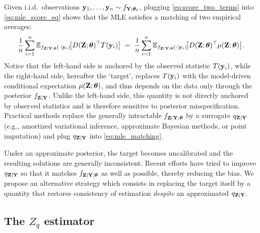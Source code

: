 \documentclass[twoside,11pt]{article}
\begin{document}
Given i.i.d.\ observations ${\bf y}_1,\dots,{\bf y}_n \sim f_{{\bf Y};{\bm{\theta}}_0}$, plugging \eqref{eq:score_two_terms}
into \eqref{eq:mle_score_eq} shows that the MLE satisfies a matching of two empirical averages:
\begin{equation}
\frac{1}{n}\sum_{i=1}^n
\mathbb{E}_{f_{{\bf Z}\mid{\bf Y};{\bm{\theta}}}(\cdot\mid {\bf y}_i)}\!\big[D({\bf Z};{\bm{\theta}})^\top T({\bf y}_i)\big]
\;=\;
\frac{1}{n}\sum_{i=1}^n
\mathbb{E}_{f_{{\bf Z}\mid{\bf Y};{\bm{\theta}}}(\cdot\mid {\bf y}_i)}\!\big[D({\bf Z};{\bm{\theta}})^\top \mu({\bf Z};{\bm{\theta}})\big].
\label{eq:mle_matching}
\end{equation}
Notice that the left-hand side is anchored by the observed statistic $T({\bf y}_i)$, while the right-hand
side, hereafter the `target', replaces $T({\bf y}_i)$ with the model-driven conditional expectation $\mu({\bf Z};{\bm{\theta}})$, and thus depends on the data only through the posterior $f_{{\bf Z}\mid{\bf Y}}$. Unlike the left-hand side, this quantity is not directly anchored by observed statistics and is therefore sensitive to posterior misspecification. Practical methods replace the generally intractable $f_{{\bf Z}\mid{\bf Y};{\bm{\theta}}}$ by a surrogate
$q_{{\bf Z}\mid{\bf Y}}$ (e.g., amortized variational inference, approximate Bayesian methods, or
point imputation) and plug $q_{{\bf Z}\mid{\bf Y}}$ into \eqref{eq:mle_matching}.

Under an approximate posterior, the target becomes uncalibrated and the resulting solutions are generally inconsistent. Recent efforts have tried to improve $q_{{\bf Z}\mid{\bf Y}}$ so that it matches $f_{{\bf Z}\mid{\bf Y};{\bm{\theta}}}$ as well as possible, thereby reducing the bias. We propose an alternative strategy which consists in replacing the target itself by a quantity that restores consistency of estimation \textit{despite} an approximated $q_{{\bf Z}\mid{\bf Y}}$.

\subsection{The $Z_q$ estimator}
\label{sec:zq_estimator}
\end{document}
